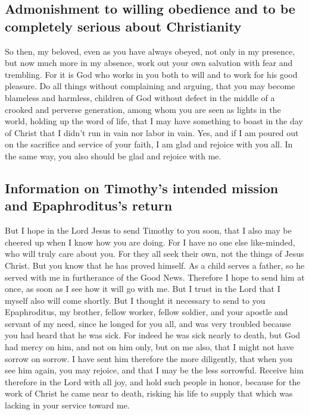 \hypertarget{admonishment-to-willing-obedience-and-to-be-completely-serious-about-christianity}{%
\subsection{Admonishment to willing obedience and to be completely
serious about
Christianity}\label{admonishment-to-willing-obedience-and-to-be-completely-serious-about-christianity}}

 So then, my beloved, even as you have always obeyed, not
only in my presence, but now much more in my absence, work out your own
salvation with fear and trembling.  For it is God who
works in you both to will and to work for his good pleasure.
 Do all things without complaining and arguing,
 that you may become blameless and harmless, children of
God without defect in the middle of a crooked and perverse generation,
among whom you are seen as lights in the world,  holding
up the word of life, that I may have something to boast in the day of
Christ that I didn't run in vain nor labor in vain.  Yes,
and if I am poured out on the sacrifice and service of your faith, I am
glad and rejoice with you all.  In the same way, you also
should be glad and rejoice with me.

\hypertarget{information-on-timothys-intended-mission-and-epaphrodituss-return}{%
\subsection{Information on Timothy's intended mission and Epaphroditus's
return}\label{information-on-timothys-intended-mission-and-epaphrodituss-return}}

 But I hope in the Lord Jesus to send Timothy to you
soon, that I also may be cheered up when I know how you are doing.
 For I have no one else like-minded, who will truly care
about you.  For they all seek their own, not the things
of Jesus Christ.  But you know that he has proved
himself. As a child serves a father, so he served with me in furtherance
of the Good News.  Therefore I hope to send him at once,
as soon as I see how it will go with me.  But I trust in
the Lord that I myself also will come shortly.  But I
thought it necessary to send to you Epaphroditus, my brother, fellow
worker, fellow soldier, and your apostle and servant of my need,
 since he longed for you all, and was very troubled
because you had heard that he was sick.  For indeed he
was sick nearly to death, but God had mercy on him, and not on him only,
but on me also, that I might not have sorrow on sorrow. 
I have sent him therefore the more diligently, that when you see him
again, you may rejoice, and that I may be the less sorrowful.
 Receive him therefore in the Lord with all joy, and hold
such people in honor,  because for the work of Christ he
came near to death, risking his life to supply that which was lacking in
your service toward me.

